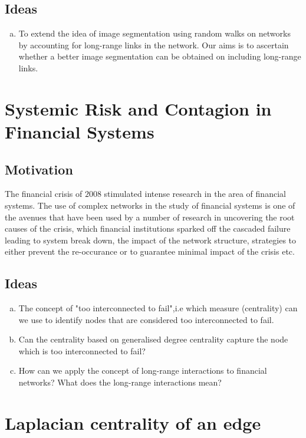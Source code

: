 \documentclass[10pt,a4paper]{article}
\begin{document}
    \subsection{Ideas}
    \begin{enumerate}[a)]
    	\item To extend the idea of image segmentation using random walks on networks by accounting for long-range links in the network. Our aims is to ascertain whether a better image segmentation can be obtained on including long-range links.  
    \end{enumerate}
    \section{Systemic Risk and Contagion in Financial Systems}
    \subsection{Motivation}
    The financial crisis of $2008$ stimulated intense research in the area of financial systems. The use of complex networks in the study of financial systems is one of the avenues that have been used by a number of research in uncovering the root causes of the crisis, which financial institutions sparked off the cascaded failure leading to system break down, the impact of the network structure, strategies to  either prevent the re-occurance or to guarantee minimal impact of the crisis etc. 
    \subsection{Ideas}
    \begin{enumerate}[a)]
    	\item The concept of "too interconnected to fail",i.e which measure (centrality) can we use to identify nodes that are considered too interconnected to fail.
    	\item Can the centrality based on generalised degree centrality capture the node which is too interconnected to fail?
    	\item How can we apply the concept of long-range interactions to financial networks? What does the long-range interactions mean?
    \end{enumerate}
	\section{Laplacian centrality of an edge}
\end{document}
